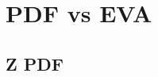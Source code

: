 \documentclass[a4paper,11pt]{article}
\begin{document}
%
%


\clearpage






\appendix

\clearpage

\section{PDF vs EVA}
\label{app:PDFsEVA}

\subsection{Z PDF}
\label{app:PDFsEVA_Z}
\end{document}

